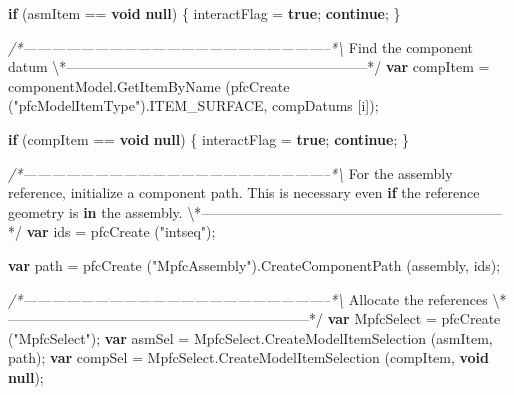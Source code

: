 \documentclass[]{article}
\newenvironment{Shaded}{}{}
\newcommand{\KeywordTok}[1]{\textcolor[rgb]{0.00,0.44,0.13}{\textbf{{#1}}}}
\newcommand{\StringTok}[1]{\textcolor[rgb]{0.25,0.44,0.63}{{#1}}}
\newcommand{\CommentTok}[1]{\textcolor[rgb]{0.38,0.63,0.69}{\textit{{#1}}}}
\newcommand{\OtherTok}[1]{\textcolor[rgb]{0.00,0.44,0.13}{{#1}}}
\newcommand{\FunctionTok}[1]{\textcolor[rgb]{0.02,0.16,0.49}{{#1}}}
\newcommand{\NormalTok}[1]{{#1}}
\begin{document}
\begin{Shaded}
\begin{Highlighting}[]
      \KeywordTok{if} \NormalTok{(asmItem == }\KeywordTok{void} \KeywordTok{null}\NormalTok{) }
    \NormalTok{\{}
      \NormalTok{interactFlag = }\KeywordTok{true}\NormalTok{;}
      \KeywordTok{continue}\NormalTok{;}
    \NormalTok{\}}
      
\CommentTok{/*-----------------------------------------------------------------*\textbackslash{}}
  \NormalTok{Find the component datum}
\NormalTok{\textbackslash{}*-----------------------------------------------------------------*}\OtherTok{/}
      \KeywordTok{var} \NormalTok{compItem = }
    \OtherTok{componentModel}\NormalTok{.}\FunctionTok{GetItemByName} \NormalTok{(}\FunctionTok{pfcCreate} \NormalTok{(}\StringTok{"pfcModelItemType"}\NormalTok{).}\FunctionTok{ITEM_SURFACE}\NormalTok{, }
                      \NormalTok{compDatums [i]);}
      
      \KeywordTok{if} \NormalTok{(compItem == }\KeywordTok{void} \KeywordTok{null}\NormalTok{) }
    \NormalTok{\{}
      \NormalTok{interactFlag = }\KeywordTok{true}\NormalTok{;}
      \KeywordTok{continue}\NormalTok{;}
    \NormalTok{\}}

\CommentTok{/*-----------------------------------------------------------------*\textbackslash{}}
  \NormalTok{For the assembly reference, initialize a component }\OtherTok{path}\NormalTok{.}
  \NormalTok{This is necessary even }\KeywordTok{if} \NormalTok{the reference geometry is }\KeywordTok{in} \NormalTok{the }\OtherTok{assembly}\NormalTok{.}
\NormalTok{\textbackslash{}*-----------------------------------------------------------------*}\OtherTok{/}
      \KeywordTok{var} \NormalTok{ids = }\FunctionTok{pfcCreate} \NormalTok{(}\StringTok{"intseq"}\NormalTok{);}
      
      \KeywordTok{var} \NormalTok{path = }\FunctionTok{pfcCreate} \NormalTok{(}\StringTok{"MpfcAssembly"}\NormalTok{).}\FunctionTok{CreateComponentPath} \NormalTok{(assembly,}
                                 \NormalTok{ids);}
      
\CommentTok{/*-----------------------------------------------------------------*\textbackslash{}}
  \NormalTok{Allocate the references}
\NormalTok{\textbackslash{}*-----------------------------------------------------------------*}\OtherTok{/}
      \KeywordTok{var} \NormalTok{MpfcSelect = }\FunctionTok{pfcCreate} \NormalTok{(}\StringTok{"MpfcSelect"}\NormalTok{);}
      \KeywordTok{var} \NormalTok{asmSel = }\OtherTok{MpfcSelect}\NormalTok{.}\FunctionTok{CreateModelItemSelection} \NormalTok{(asmItem, path);}
      \KeywordTok{var} \NormalTok{compSel = }\OtherTok{MpfcSelect}\NormalTok{.}\FunctionTok{CreateModelItemSelection} \NormalTok{(compItem, }\KeywordTok{void} \KeywordTok{null}\NormalTok{);}
      

\end{Highlighting}
\end{Shaded}
\end{document}
